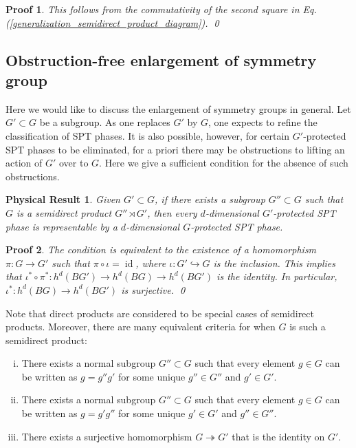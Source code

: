 \documentclass[sort&compress]{elsarticle}
\theoremstyle{theoremstyle}
\theoremstyle{framedtheoremstyle}
\newtheorem{rslt}{Physical Result}
\theoremstyle{definitionstyle}
\theoremstyle{definitionstyle}
\theoremstyle{definitionstyle}
\theoremstyle{definitionstyle}
\theoremstyle{nameddefinitionstyle}
\theoremstyle{framednameddefinitionstyle}
\theoremstyle{proofstyle}
\newtheorem{pf}{Proof}
\theoremstyle{definitionstyle}
\newcommand{\fromto}{\rightarrow}
\newcommand{\oneone}{\hookrightarrow}
\newcommand{\onto}{\twoheadrightarrow}
\DeclareMathOperator{\identity}{id}
\newcommand{\paren}[1]{\left( #1 \right)}
\begin{document}
\begin{pf}
This follows from the commutativity of the second square in Eq.\,(\ref{generalization_semidirect_product_diagram}).
\qed\end{pf}





\subsection{Obstruction-free enlargement of symmetry group \label{subsec:obstruction_free_enlargement_symmetry_group}}

Here we would like to discuss the enlargement of symmetry groups in general. Let $G' \subset G$ be a subgroup. As one replaces $G'$ by $G$, one expects to refine the classification of SPT phases. It is also possible, however, for certain $G'$-protected SPT phases to be eliminated, for a priori there may be obstructions to lifting an action of $G'$ over to $G$. Here we give a sufficient condition for the absence of such obstructions.

\begin{framed}\begin{rslt}
Given $G' \subset G$, if there exists a subgroup $G''\subset G$ such that $G$ is a semidirect product $G'' \rtimes G'$, then every $d$-dimensional $G'$-protected SPT phase is representable by a $d$-dimensional $G$-protected SPT phase.
\end{rslt}\end{framed}

\begin{pf}
The condition is equivalent to the existence of a homomorphism $\pi: G \fromto G'$ such that $\pi \circ \iota= \identity$, where $\iota: G' \oneone G$ is the inclusion. This implies that $\iota^*\circ \pi^*: h^d\paren{BG'} \fromto h^d\paren{BG} \fromto h^d\paren{BG'}$ is the identity. In particular, $\iota^*: h^d\paren{BG} \fromto h^d\paren{BG'}$ is surjective.
\qed\end{pf}

Note that direct products are considered to be special cases of semidirect products. Moreover, there are many equivalent criteria for when $G$ is such a semidirect product:
\begin{enumerate}[(i)]
\item There exists a normal subgroup $G''\subset G$ such that every element $g\in G$ can be written as $g= g''g'$ for some unique $g''\in G''$ and $g'\in G'$.

\item There exists a normal subgroup $G''\subset G$ such that every element $g\in G$ can be written as $g= g'g''$ for some unique $g'\in G'$ and $g''\in G''$.

\item There exists a surjective homomorphism $G \onto G'$ that is the identity on $G'$.
\end{enumerate}
\end{document}
